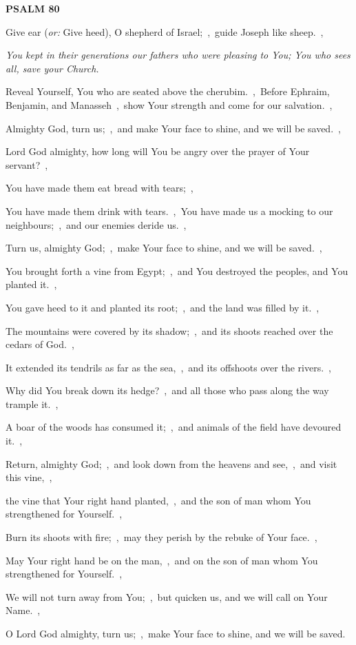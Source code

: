 \documentclass[12pt,twoside,a5paper]{article}
\newcommand{\psalm}[1]{\textbf{PSALM {#1}}\nopagebreak}
\newcommand{\qanona}[1]{{\liturgicalhint{Qanona.} \emph{#1}}}
\newcommand{\translationoption}[1]{\emph{or:} #1}
\begin{document}
\psalm{80}

\begin{normalparskip}
  Give ear (\translationoption{Give heed}), O shepherd of Israel;~\sep\ guide Joseph like sheep.~\sep

  \qanona{You kept in their generations our fathers who were pleasing to You; You who sees all, save your Church.}

  Reveal Yourself, You who are seated above the cherubim.~\sep\ Before Ephraim, Benjamin, and Manasseh~\sep\ show Your strength and come for our salvation.~\sep

  Almighty God, turn us;~\sep\ and make Your face to shine, and we will be saved.~\sep

  Lord God almighty, how long will You be angry over the prayer of Your servant?~\sep

  You have made them eat bread with tears;~\sep

  You have made them drink with tears.~\sep\ You have made us a mocking to our neighbours;~\sep\ and our enemies deride us.~\sep

  Turn us, almighty God;~\sep\ make Your face to shine, and we will be saved.~\sep

  You brought forth a vine from Egypt;~\sep\ and You destroyed the peoples, and You planted it.~\sep

  You gave heed to it and planted its root;~\sep\ and the land was filled by it.~\sep

  The mountains were covered by its shadow;~\sep\ and its shoots reached over the cedars of God.~\sep

  It extended its tendrils as far as the sea,~\sep\ and its offshoots over the rivers.~\sep

  Why did You break down its hedge?~\sep\ and all those who pass along the way trample it.~\sep

  A boar of the woods has consumed it;~\sep\ and animals of the field have devoured it.~\sep

  Return, almighty God;~\sep\ and look down from the heavens and see,~\sep\ and visit this vine,~\sep

  the vine that Your right hand planted,~\sep\ and the son of man whom You strengthened for Yourself.~\sep

  Burn its shoots with fire;~\sep\ may they perish by the rebuke of Your face.~\sep

  May Your right hand be on the man,~\sep\ and on the son of man whom You strengthened for Yourself.~\sep

  We will not turn away from You;~\sep\ but quicken us, and we will call on Your Name.~\sep

  O Lord God almighty, turn us;~\sep\ make Your face to shine, and we will be saved.
\end{normalparskip}
\end{document}
